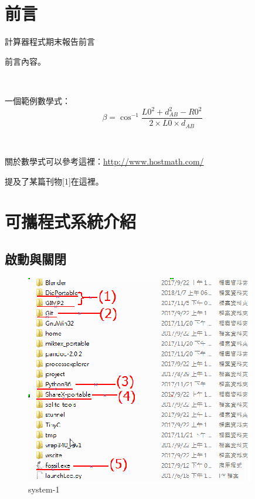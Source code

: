 \documentclass[12pt,,]{report}
\begin{document}
\begingroup
    \renewcommand{\contentsname}{\center 目錄 \addcontentsline{toc}{chapter}{目錄}}
    \renewcommand{\numberline}[1]{~#1\hspace*{1em}}
        \setcounter{tocdepth}{2}
    \tableofcontents
    \newcommand{\lotlabel}{表}
    \renewcommand{\listtablename}{\center 表目錄 \addcontentsline{toc}{chapter}{表目錄}}
    \renewcommand{\numberline}[1]{\lotlabel~#1\hspace*{1em}}
    \listoftables
    \newcommand{\loflabel}{圖}
    \renewcommand{\listfigurename}{\center 圖目錄 \addcontentsline{toc}{chapter}{圖目錄}}
    \renewcommand{\numberline}[1]{\loflabel~#1\hspace*{1em}}
    \listoffigures
\endgroup

\mainmatter
\hypertarget{ux524dux8a00}{%
\chapter{前言}\label{ux524dux8a00}}

計算器程式期末報告前言

前言內容。

~

一個範例數學式：\[\beta=\cos^{-1}{\frac{L0^{2}+d_{AB}^{2}-R0^{2}}{2\times{L0\times{d_{AB}}}}}\]

~

關於數學式可以參考這裡：\url{http://www.hostmath.com/}

提及了某篇刊物{[}1{]}在這裡。

\hypertarget{ux53efux651cux7a0bux5f0fux7cfbux7d71ux4ecbux7d39}{%
\chapter{可攜程式系統介紹}\label{ux53efux651cux7a0bux5f0fux7cfbux7d71ux4ecbux7d39}}

\hypertarget{ux555fux52d5ux8207ux95dcux9589}{%
\section{啟動與關閉}\label{ux555fux52d5ux8207ux95dcux9589}}

\begin{figure}
\centering
\includegraphics{./tex2pdf.17748/caf4a9154d74acc2785da5493d834ee1f5907b1f.png}
\caption{system-1\label{fig:格子}}
\end{figure}
\end{document}
